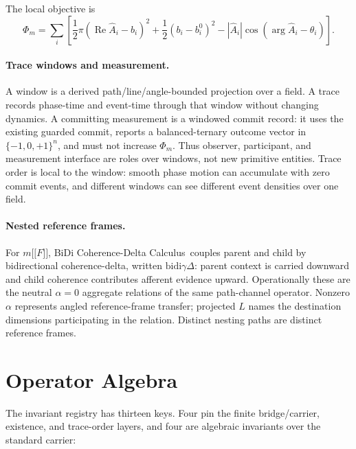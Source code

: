 \documentclass[11pt]{article}
\newcommand{\CDC}{BiDi Coherence-Delta Calculus}
\newcommand{\bidi}{\mathrm{bidi}\gamma\Delta}
\newcommand{\nest}[1]{\mathopen{[\![}#1\mathclose{]\!]}}
\begin{document}
The local objective is
\[
\Phi_m =
\sum_i \left[
\frac{1}{2}\pi(\operatorname{Re}\hat A_i-b_i)^2
+\frac{1}{2}(b_i-b_i^0)^2
-|\hat A_i|\cos(\arg\hat A_i-\theta_i)
\right].
\]

\paragraph{Trace windows and measurement.}
A window is a derived path/line/angle-bounded projection over a field. A trace
records phase-time and event-time through that window without changing dynamics.
A committing measurement is a windowed commit record: it uses the existing
guarded commit, reports a balanced-ternary outcome vector in
$\{-1,0,+1\}^n$, and must not increase $\Phi_m$. Thus observer, participant,
and measurement interface are roles over windows, not new primitive entities.
Trace order is local to the window: smooth phase motion can accumulate with zero
commit events, and different windows can see different event densities over one
field.

\paragraph{Nested reference frames.}
For $m\nest{F}$, \CDC\ couples parent and child by bidirectional
coherence-delta, written $\bidi$: parent context is carried downward and child
coherence contributes afferent evidence upward. Operationally these are the
neutral $\alpha=0$ aggregate relations of the same path-channel operator.
Nonzero $\alpha$ represents angled reference-frame transfer; projected $L$ names
the destination dimensions participating in the relation. Distinct nesting paths
are distinct reference frames.

\section{Operator Algebra}

The invariant registry has thirteen keys. Four pin the finite bridge/carrier,
existence, and trace-order layers, and four are algebraic invariants over the
standard carrier:
\end{document}
